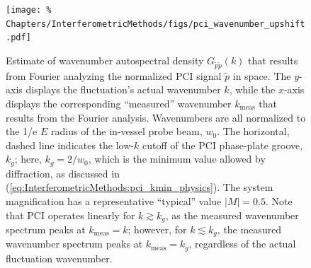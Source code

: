 \begin{figure}
  \centering
  \texttt{[image: \%
    Chapters/InterferometricMethods/figs/pci\_wavenumber\_upshift.pdf]}
    \caption[Nonlinear upshift in low-$k$, PCI-measured wavenumber]{%
    Estimate of wavenumber autospectral density $G_{\tilde{p}\tilde{p}}(k)$
    that results from Fourier analyzing
    the normalized PCI signal $\tilde{p}$ in space.
    The $y$-axis displays the fluctuation's actual wavenumber $k$, while
    the $x$-axis displays the corresponding ``measured'' wavenumber
    $k_{\text{meas}}$ that results from the Fourier analysis.
    Wavenumbers are all normalized
    to the 1/e $E$ radius of the in-vessel probe beam, $w_0$.
    The horizontal, dashed line indicates
    the low-$k$ cutoff of the PCI phase-plate groove, $k_g$;
    here, $k_g = 2 / w_0$,
    which is the minimum value allowed by diffraction,
    as discussed in
    (\ref{eq:InterferometricMethods:pci_kmin_physics}).
    The system magnification has
    a representative ``typical'' value $|M| = 0.5$.
    Note that PCI operates linearly for $k \gtrsim k_g$,
    as the measured wavenumber spectrum peaks at $k_{\text{meas}} = k$;
    however, for $k \lesssim k_g$,
    the measured wavenumber spectrum peaks at $k_{\text{meas}} = k_g$,
    regardless of the actual fluctuation wavenumber.
  }
\label{fig:InterferometricMethods:pci_wavenumber_upshift}
\end{figure}


